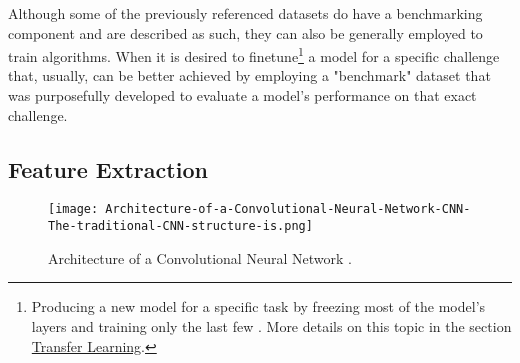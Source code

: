 \documentclass[class=report, crop=false, a4paper, 12pt]{standalone}
\begin{document}
\vspace{\baselineskip}
\par Although some of the previously referenced datasets do have a benchmarking component and are described as such, they can also be generally employed to train algorithms. When it is desired to finetune\footnote{Producing a new model for a specific task by freezing most of the model's layers and training only the last few \autocite{zhuangComprehensiveSurveyTransfer2020}. More details on this topic in the section \hyperref[transf learning]{Transfer Learning}.} a model for a specific challenge that, usually,  can be better achieved by employing a "benchmark" dataset that was purposefully developed to evaluate a model's performance on that exact challenge. 

\vspace{\baselineskip}
\centerline{
    \noindent
}


\newpage
\subsection{Feature Extraction}

\begin{figure}[!h]
    \centering
    \texttt{[image: Architecture-of-a-Convolutional-Neural-Network-CNN-The-traditional-CNN-structure-is.png]}
    \caption{Architecture of a Convolutional Neural Network \autocite{kangDeepSimilarityMetric2019}.}
    \label{fig:cnn}
\end{figure}
\end{document}
